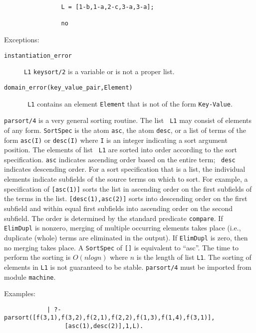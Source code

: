 \begin{description}
{\begin{verbatim}
                L = [1-b,1-a,2-c,3-a,3-a];

                no \end{verbatim}}
     Exceptions: 
\begin{description} 
\item[{\tt instantiation\_error}]
     {\tt L1} {\tt keysort/2} is a variable or is not a proper
     list.  
\item[{\tt domain\_error(key\_value\_pair,Element)}] {\tt
     L1} contains an element {\tt Element} that is not of the
     form \verb'Key-Value'.  
\end{description}


    {\tt parsort/4} is a very general sorting routine.  The list {\tt
    L1} may consist of elements of any form.  {\tt SortSpec} is the
    atom {\tt asc}, the atom {\tt desc}, or a list of terms of the
    form {\tt asc(I)} or {\tt desc(I)} where {\tt I} is an integer
    indicating a sort argument position.  The elements of list {\tt
    L1} are sorted into order according to the sort specification.
    {\tt asc} indicates ascending order based on the entire term; {\tt
    desc} indicates descending order.  For a sort specification that
    is a list, the individual elements indicate subfields of the
    source terms on which to sort.  For example, a specification of
    {\tt [asc(1)]} sorts the list in ascending order on the first
    subfields of the terms in the list.  {\tt [desc(1),asc(2)]} sorts
    into descending order on the first subfield and within equal first
    subfields into ascending order on the second subfield.  The order
    is determined by the standard predicate {\tt compare}.  If {\tt
    ElimDupl} is nonzero, merging of multiple occurring elements takes
    place (i.e., duplicate (whole) terms are eliminated in the
    output).  If {\tt ElimDupl} is zero, then no merging takes place.
    A {\tt SortSpec} of {\tt []} is equivalent to ``asc''.  The time
    to perform the sorting is $O(n log n)$ where $n$ is the length of
    list {\tt L1}.  The sorting of elements in {\tt L1} is not
    guaranteed to be stable. {\tt parsort/4} must be imported from
    module {\tt machine}.

    Examples:
    {\footnotesize
     \begin{verbatim}
            | ?- parsort([f(3,1),f(3,2),f(2,1),f(2,2),f(1,3),f(1,4),f(3,1)],
                 [asc(1),desc(2)],1,L). 


\end{verbatim}}
\end{description}
